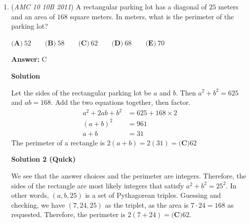 \begin{enumerate}
 We multiply by $2$ because you can either pick the negative or positive number first. 

 Thus, the probability of the product being positive is 
 \[1-\frac49 = \boxed{\textbf{(D) }\frac59}\]




\textbf{Solution 4}

We can simplify the problem down by dividing the boundary numbers by 10, which gives us $[-2,1]$. Then, it is easier for us to come to Solution 2. The probability the product is greater than zero is
 \[\frac{1}{3} \times \frac{1}{3} + \frac{2}{3} \times \frac{2}{3} = \frac{1}{9} + \frac{4}{9} = \boxed{\textbf{(D)} \frac{5}{9}}\]

 Note: the problem where this is linked is covered 1:30-2:10; however the solution focuses mainly on the concept of addition probability, so the solutions above are more in-depth (the video follows solution 1)

 


	\item (\textit{AMC 10 10B 2011}) A rectangular parking lot has a diagonal of $25$ meters and an area of $168$ square meters. In meters, what is the perimeter of the parking lot?


 $\textbf{(A)}\ 52 \qquad\textbf{(B)}\ 58 \qquad\textbf{(C)}\ 62 \qquad\textbf{(D)}\ 68 \qquad\textbf{(E)}\ 70$

 \textbf{Answer: }C



\textbf{Solution}

Let the sides of the rectangular parking lot be $a$ and $b$. Then $a^2 + b^2 = 625$ and $ab = 168$. Add the two equations together, then factor.
 \begin{align*} a^2 + 2ab + b^2 &= 625 + 168 \times 2\\ (a + b)^2 &= 961\\ a + b &= 31 \end{align*}
The perimeter of a rectangle is $2 (a + b) = 2 (31) = \boxed{\textbf{(C)} 62}$




\textbf{Solution 2 (Quick)}

We see that the answer choices and the perimeter are integers. Therefore, the sides of the rectangle are most likely integers that satisfy $a^2+b^2=25^2$. In other words, $(a,b,25)$ is a set of Pythagorean triples. Guessing and checking, we have $(7,24,25)$ as the triplet, as the area is $7 \cdot 24 = 168$ as requested. Therefore, the perimeter is $2(7+24)=\boxed{\textbf{(C)} 62}$.


\end{enumerate}
